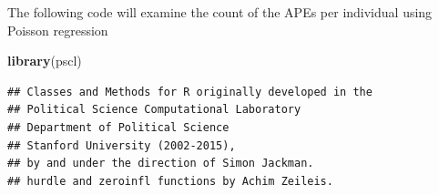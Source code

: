 \documentclass[
  12pt,
]{article}
\newenvironment{Shaded}{\begin{snugshade}}{\end{snugshade}}
\newcommand{\FunctionTok}[1]{\textcolor[rgb]{0.13,0.29,0.53}{\textbf{#1}}}
\newcommand{\NormalTok}[1]{#1}
\begin{document}
The following code will examine the count of the APEs per individual
using Poisson regression

\begin{Shaded}
\begin{Highlighting}[]
\FunctionTok{library}\NormalTok{(pscl)}
\end{Highlighting}
\end{Shaded}

\begin{verbatim}
## Classes and Methods for R originally developed in the
## Political Science Computational Laboratory
## Department of Political Science
## Stanford University (2002-2015),
## by and under the direction of Simon Jackman.
## hurdle and zeroinfl functions by Achim Zeileis.
\end{verbatim}
\end{document}
